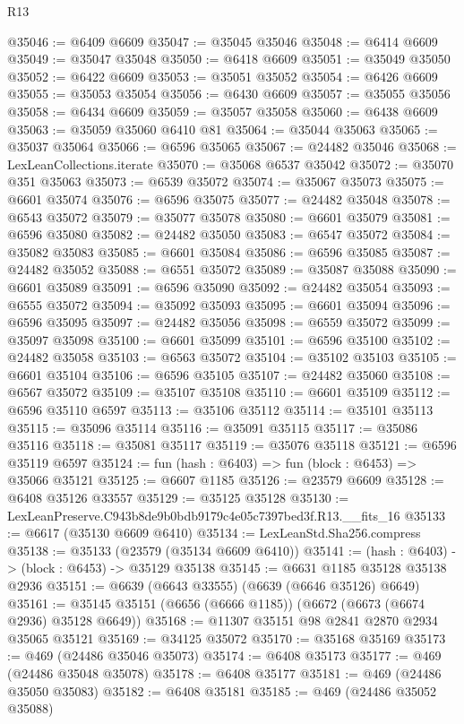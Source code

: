 \begin{lexlean}{R13}
\begin{coremodule}
@35046 := @6409 @6609
@35047 := @35045 @35046
@35048 := @6414 @6609
@35049 := @35047 @35048
@35050 := @6418 @6609
@35051 := @35049 @35050
@35052 := @6422 @6609
@35053 := @35051 @35052
@35054 := @6426 @6609
@35055 := @35053 @35054
@35056 := @6430 @6609
@35057 := @35055 @35056
@35058 := @6434 @6609
@35059 := @35057 @35058
@35060 := @6438 @6609
@35063 := @35059 @35060 @6410 @81
@35064 := @35044 @35063
@35065 := @35037 @35064
@35066 := @6596 @35065
@35067 := @24482 @35046
@35068 := LexLeanCollections.iterate
@35070 := @35068 @6537 @35042
@35072 := @35070 @351 @35063
@35073 := @6539 @35072
@35074 := @35067 @35073
@35075 := @6601 @35074
@35076 := @6596 @35075
@35077 := @24482 @35048
@35078 := @6543 @35072
@35079 := @35077 @35078
@35080 := @6601 @35079
@35081 := @6596 @35080
@35082 := @24482 @35050
@35083 := @6547 @35072
@35084 := @35082 @35083
@35085 := @6601 @35084
@35086 := @6596 @35085
@35087 := @24482 @35052
@35088 := @6551 @35072
@35089 := @35087 @35088
@35090 := @6601 @35089
@35091 := @6596 @35090
@35092 := @24482 @35054
@35093 := @6555 @35072
@35094 := @35092 @35093
@35095 := @6601 @35094
@35096 := @6596 @35095
@35097 := @24482 @35056
@35098 := @6559 @35072
@35099 := @35097 @35098
@35100 := @6601 @35099
@35101 := @6596 @35100
@35102 := @24482 @35058
@35103 := @6563 @35072
@35104 := @35102 @35103
@35105 := @6601 @35104
@35106 := @6596 @35105
@35107 := @24482 @35060
@35108 := @6567 @35072
@35109 := @35107 @35108
@35110 := @6601 @35109
@35112 := @6596 @35110 @6597
@35113 := @35106 @35112
@35114 := @35101 @35113
@35115 := @35096 @35114
@35116 := @35091 @35115
@35117 := @35086 @35116
@35118 := @35081 @35117
@35119 := @35076 @35118
@35121 := @6596 @35119 @6597
@35124 := fun (hash : @6403) => fun (block : @6453) => @35066 @35121
@35125 := @6607 @1185
@35126 := @23579 @6609
@35128 := @6408 @35126 @33557
@35129 := @35125 @35128
@35130 := LexLeanPreserve.C943b8de9b0bdb9179c4e05c7397bed3f.R13.__fits_16
@35133 := @6617 (@35130 @6609 @6410)
@35134 := LexLeanStd.Sha256.compress
@35138 := @35133 (@23579 (@35134 @6609 @6410))
@35141 := (hash : @6403) -> (block : @6453) -> @35129 @35138
@35145 := @6631 @1185 @35128 @35138 @2936
@35151 := @6639 (@6643 @33555) (@6639 (@6646 @35126) @6649)
@35161 := @35145 @35151 (@6656 (@6666 @1185)) (@6672 (@6673 (@6674 @2936) @35128 @6649))
@35168 := @11307 @35151 @98 @2841 @2870 @2934 @35065 @35121
@35169 := @34125 @35072
@35170 := @35168 @35169
@35173 := @469 (@24486 @35046 @35073)
@35174 := @6408 @35173
@35177 := @469 (@24486 @35048 @35078)
@35178 := @6408 @35177
@35181 := @469 (@24486 @35050 @35083)
@35182 := @6408 @35181
@35185 := @469 (@24486 @35052 @35088)

\end{coremodule}
\end{lexlean}
